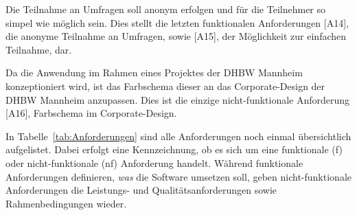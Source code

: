 Die Teilnahme an Umfragen soll anonym erfolgen und für die Teilnehmer so simpel wie möglich sein.
Dies stellt die letzten funktionalen Anforderungen [A14], die anonyme Teilnahme an Umfragen, sowie [A15], der Möglichkeit zur einfachen Teilnahme, dar.

Da die Anwendung im Rahmen eines Projektes der \acs{DHBW} Mannheim konzeptioniert wird, ist das Farbschema dieser an das Corporate-Design der \acs{DHBW} Mannheim anzupassen.
Dies ist die einzige nicht-funktionale Anforderung [A16], Farbschema im Corporate-Design.

In Tabelle~\vref{tab:Anforderungen} sind alle Anforderungen noch einmal übersichtlich aufgelistet.
Dabei erfolgt eine Kennzeichnung, ob es sich um eine funktionale (f) oder nicht-funktionale (nf) Anforderung handelt.
Während funktionale Anforderungen definieren, \emph{was} die Software umsetzen soll, geben nicht-funktionale Anforderungen die Leistungs- und Qualitätsanforderungen sowie Rahmenbedingungen wieder.\autocite[Vgl.][S. 10]{nl-robertson2012mastering}\autocite[Vgl.][S. 3 ff]{nl-braun2016nicht}

